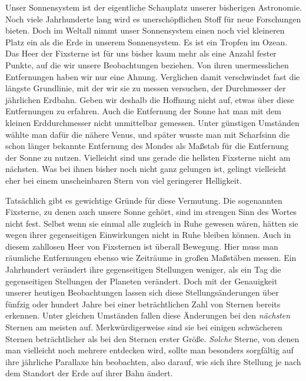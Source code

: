 Unser Sonnensystem ist der eigentliche Schauplatz unserer bisherigen Astronomie. Noch viele Jahrhunderte lang wird es unerschöpflichen Stoff für neue Forschungen bieten. Doch im Weltall nimmt unser Sonnensystem einen noch viel kleineren Platz ein als die Erde in unserem Sonnensystem. Es ist ein Tropfen im Ozean. Das Heer der Fixsterne ist für uns bisher kaum mehr als eine Anzahl fester Punkte, auf die wir unsere Beobachtungen beziehen. Von ihren unermesslichen Entfernungen haben wir nur eine Ahnung. Verglichen damit verschwindet fast die längste Grundlinie, mit der wir sie zu messen versuchen, der Durchmesser der jährlichen Erdbahn. Geben wir deshalb die Hoffnung nicht auf, etwas über diese Entfernungen zu erfahren. Auch die Entfernung der Sonne hat man mit dem kleinen Erddurchmesser nicht unmittelbar gemessen. Unter günstigen Umständen wählte man dafür die nähere Venus{\renewcommand{\thefootnote}{**)}}, und später wusste man mit Scharfsinn die schon länger bekannte Entfernung des Mondes als Maßstab für die Entfernung der Sonne zu nutzen{\renewcommand{\thefootnote}{***)}}. Vielleicht sind uns gerade die hellsten Fixsterne nicht am nächsten. Was bei ihnen bisher noch nicht ganz gelungen ist, gelingt vielleicht eher bei einem unscheinbaren Stern von viel geringerer Helligkeit.

Tatsächlich gibt es gewichtige Gründe für diese Vermutung. Die sogenannten Fixsterne, zu denen auch unsere Sonne gehört, sind im strengen Sinn des Wortes nicht fest. Selbst wenn sie einmal alle zugleich in Ruhe gewesen wären, hätten sie wegen ihrer gegenseitigen Einwirkungen nicht in Ruhe bleiben können. Auch in diesem zahllosen Heer von Fixsternen ist überall Bewegung. Hier muss man räumliche Entfernungen ebenso wie Zeiträume in großen Maßstäben messen.
%
Ein Jahrhundert verändert ihre gegenseitigen Stellungen weniger, als ein Tag die gegenseitigen Stellungen der Planeten verändert. Doch mit der Genauigkeit unserer heutigen Beobachtungen lassen sich diese Stellungsänderungen über fünfzig oder hundert Jahre bei einer beträchtlichen Zahl von Sternen bereits erkennen. Unter gleichen Umständen fallen diese Änderungen bei den \emph{nächsten} Sternen am meisten auf. Merkwürdigerweise sind sie bei einigen schwächeren Sternen beträchtlicher als bei den Sternen erster Größe. \emph{Solche} Sterne, von denen man vielleicht noch mehrere entdecken wird, sollte man besonders sorgfältig auf ihre jährliche Parallaxe hin beobachten, also darauf, wie sich ihre Stellung je nach dem Standort der Erde auf ihrer Bahn ändert.

